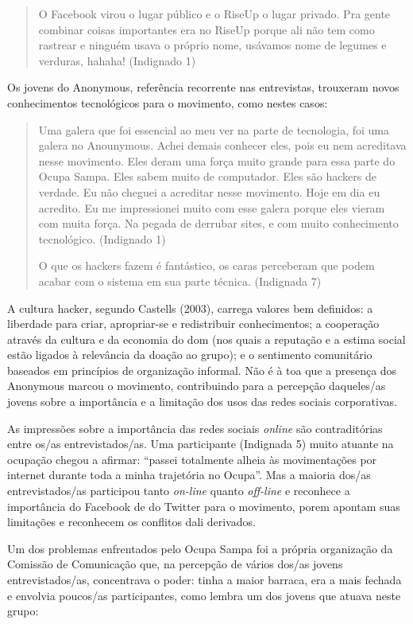 \begin{quote}
O Facebook virou o lugar público e o RiseUp o lugar privado. Pra gente
combinar coisas importantes era no RiseUp porque ali não tem como
rastrear e ninguém usava o próprio nome, usávamos nome de legumes e
verduras, hahaha! (Indignado 1)
\end{quote}

Os jovens do Anonymous, referência recorrente nas entrevistas, trouxeram
novos conhecimentos tecnológicos para o movimento, como nestes casos:

\begin{quote}
Uma galera que foi essencial ao meu ver na parte de tecnologia, foi uma
galera no Anounymous. Achei demais conhecer eles, pois eu nem acreditava
nesse movimento. Eles deram uma força muito grande para essa parte do
Ocupa Sampa. Eles sabem muito de computador. Eles são hackers de
verdade. Eu não cheguei a acreditar nesse movimento. Hoje em dia eu
acredito. Eu me impressionei muito com esse galera porque eles vieram
com muita força. Na pegada de derrubar sites, e com muito conhecimento
tecnológico. (Indignado 1)

O que os hackers fazem é fantástico, os caras perceberam que podem
acabar com o sistema em sua parte técnica. (Indignada 7)
\end{quote}

A cultura hacker, segundo Castells (2003), carrega valores bem
definidos: a liberdade para criar, apropriar-se e redistribuir
conhecimentos; a cooperação através da cultura e da economia do dom (nos
quais a reputação e a estima social estão ligados à relevância da doação
ao grupo); e o sentimento comunitário baseados em princípios de
organização informal. Não é à toa que a presença dos Anonymous marcou o
movimento, contribuindo para a percepção daqueles/as jovens sobre a
importância e a limitação dos usos das redes sociais corporativas.

As impressões sobre a importância das redes sociais \emph{online} são
contraditórias entre os/as entrevistados/as. Uma participante (Indignada
5) muito atuante na ocupação chegou a afirmar: ``passei totalmente
alheia às movimentações por internet durante toda a minha trajetória no
Ocupa''. Mas a maioria dos/as entrevistados/as participou tanto
\emph{on-line} quanto \emph{off-line} e reconhece a importância do
Facebook de do Twitter para o movimento, porem apontam suas limitações e
reconhecem os conflitos dali derivados.

Um dos problemas enfrentados pelo Ocupa Sampa foi a própria organização
da Comissão de Comunicação que, na percepção de vários dos/as jovens
entrevistados/as, concentrava o poder: tinha a maior barraca, era a mais
fechada e envolvia poucos/as participantes, como lembra um dos jovens
que atuava neste grupo:

